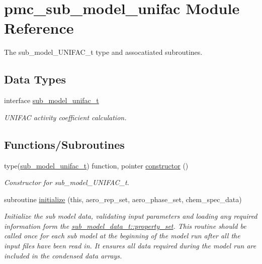 \hypertarget{namespacepmc__sub__model__unifac}{}\section{pmc\+\_\+sub\+\_\+model\+\_\+unifac Module Reference}
\label{namespacepmc__sub__model__unifac}


The sub\+\_\+model\+\_\+\+U\+N\+I\+F\+A\+C\+\_\+t type and assocatiated subroutines.  


\subsection*{Data Types}
\begin{DoxyCompactItemize}
\item 
interface \mbox{\hyperlink{structpmc__sub__model__unifac_1_1sub__model__unifac__t}{sub\+\_\+model\+\_\+unifac\+\_\+t}}
\begin{DoxyCompactList}\small\item\em U\+N\+I\+F\+AC activity coefficient calculation. \end{DoxyCompactList}\end{DoxyCompactItemize}
\subsection*{Functions/\+Subroutines}
\begin{DoxyCompactItemize}
\item 
type(\mbox{\hyperlink{structpmc__sub__model__unifac_1_1sub__model__unifac__t}{sub\+\_\+model\+\_\+unifac\+\_\+t}}) function, pointer \mbox{\hyperlink{namespacepmc__sub__model__unifac_a7fec1fd7bbc74086fab284260f53b3aa}{constructor}} ()
\begin{DoxyCompactList}\small\item\em Constructor for sub\+\_\+model\+\_\+\+U\+N\+I\+F\+A\+C\+\_\+t. \end{DoxyCompactList}\item 
subroutine \mbox{\hyperlink{namespacepmc__sub__model__unifac_ae9201c599c1dd41196467fc292445b20}{initialize}} (this, aero\+\_\+rep\+\_\+set, aero\+\_\+phase\+\_\+set, chem\+\_\+spec\+\_\+data)
\begin{DoxyCompactList}\small\item\em Initialize the sub model data, validating input parameters and loading any required information form the {\ttfamily \mbox{\hyperlink{structpmc__sub__model__data_1_1sub__model__data__t_aeb00155797966fc95e75ad14d45e7242}{sub\+\_\+model\+\_\+data\+\_\+t\+::property\+\_\+set}}}. This routine should be called once for each sub model at the beginning of the model run after all the input files have been read in. It ensures all data required during the model run are included in the condensed data arrays. \end{DoxyCompactList}\end{DoxyCompactItemize}


